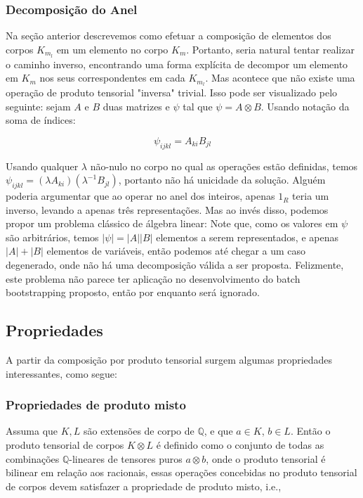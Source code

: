 \subsubsection{Decomposição do Anel}
Na seção anterior descrevemos como efetuar a composição de elementos dos corpos $K_{m_l}$ em um elemento no corpo $K_m$.
Portanto, seria natural tentar realizar o caminho inverso, encontrando uma forma explícita de decompor um elemento em $K_m$ nos seus correspondentes em cada $K_{m_l}$. 
Mas acontece que não existe uma operação de produto tensorial "inversa" trivial. Isso pode ser visualizado pelo seguinte: sejam $A$ e $B$ duas matrizes e $\psi$ tal que $\psi = A \otimes B$. 
Usando notação da soma de índices:

\begin{equation}
    \psi_{ijkl} = A_{ki} B_{jl}
\end{equation}

Usando qualquer $\lambda$ não-nulo no corpo no qual as operações estão definidas, temos $\psi_{ijkl} = (\lambda A_{ki}) (\lambda^{-1}B_{jl})$, portanto não há unicidade da solução. Alguém poderia argumentar que ao operar no anel dos inteiros,
apenas $1_{R}$ teria um inverso, levando a apenas três representações. Mas ao invés disso, podemos propor um problema clássico de álgebra linear: Note que, como os valores em $\psi$ são arbitrários, temos $|\psi| = |A||B|$ elementos a serem representados,
e apenas $|A| + |B|$ elementos de variáveis, então podemos até chegar a um caso degenerado, onde não há uma decomposição válida a ser proposta. Felizmente, este problema não parece ter aplicação no desenvolvimento do batch bootstrapping proposto,
então por enquanto será ignorado.

\subsection{Propriedades}

A partir da composição por produto tensorial surgem algumas propriedades interessantes, como segue:

\subsubsection{Propriedades de produto misto}
Assuma que $K, L$ são extensões de corpo de $\mathbb{Q}$, e que $a \in K$, $b \in L$. Então o produto tensorial de corpos $K \otimes L$ é definido como o conjunto de todas as combinações $\mathbb{Q}$-lineares de tensores puros $a \otimes b$, onde o produto tensorial
é bilinear em relação aos racionais, essas operações concebidas no produto tensorial de corpos devem satisfazer a propriedade de produto misto, i.e.,

